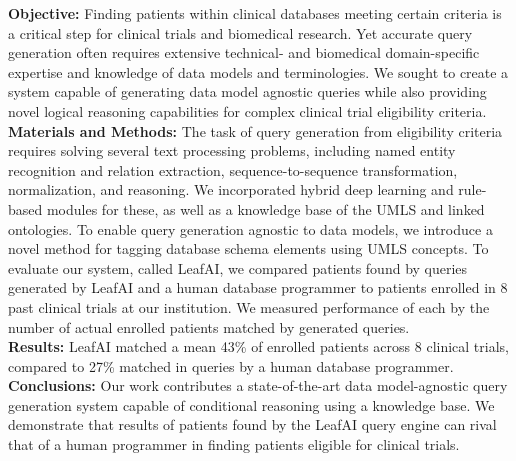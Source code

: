 \documentclass[../main.tex]{subfiles}
\begin{document}
\noindent\textbf{Objective:} Finding patients within clinical databases meeting certain criteria is a critical step for clinical trials and biomedical research. Yet accurate query generation often requires extensive technical- and biomedical domain-specific expertise and knowledge of data models and terminologies. We sought to create a system capable of generating data model agnostic queries while also providing novel logical reasoning capabilities for complex clinical trial eligibility criteria. \\

\noindent\textbf{Materials and Methods:} The task of query generation from eligibility criteria requires solving several text processing problems, including named entity recognition and relation extraction, sequence-to-sequence transformation, normalization, and reasoning. We incorporated hybrid deep learning and rule-based modules for these, as well as a knowledge base of the UMLS and linked ontologies. To enable query generation agnostic to data models, we introduce a novel method for tagging database schema elements using UMLS concepts. To evaluate our system, called LeafAI, we compared patients found by queries generated by LeafAI and a human database programmer to patients enrolled in 8 past clinical trials at our institution. We measured performance of each by the number of actual enrolled patients matched by generated queries. \\

\noindent\textbf{Results:} LeafAI matched a mean 43\% of enrolled patients across 8 clinical trials, compared to 27\% matched in queries by a human database programmer. \\

\noindent\textbf{Conclusions:} Our work contributes a state-of-the-art data model-agnostic query generation system capable of conditional reasoning using a knowledge base. We demonstrate that results of patients found by the LeafAI query engine can rival that of a human programmer in finding patients eligible for clinical trials.
\end{document}

